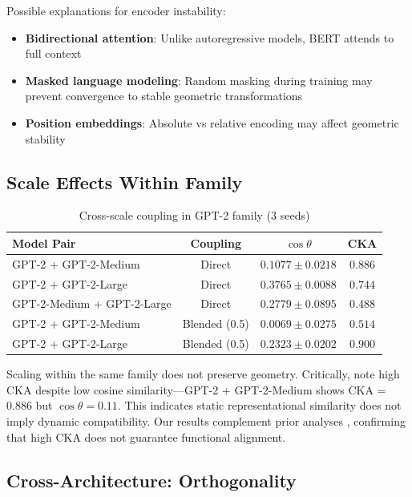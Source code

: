 \documentclass[10pt]{article} %
\theoremstyle{plain}
\theoremstyle{definition}
\theoremstyle{remark}
\begin{document}
Possible explanations for encoder instability:
\begin{itemize}
    \item \textbf{Bidirectional attention}: Unlike autoregressive models, BERT attends to full context
    \item \textbf{Masked language modeling}: Random masking during training may prevent convergence to stable geometric transformations
    \item \textbf{Position embeddings}: Absolute vs relative encoding may affect geometric stability
\end{itemize}

\subsection{Scale Effects Within Family}

\begin{table}[htbp]
\centering
\caption{Cross-scale coupling in GPT-2 family (3 seeds)}
\label{tab:scale}
\small
\begin{tabular}{lccc}
\toprule
\textbf{Model Pair} & \textbf{Coupling} & \textbf{$\cos \theta$} & \textbf{CKA} \\
\midrule
GPT-2 + GPT-2-Medium & Direct & $0.1077 \pm 0.0218$ & $0.886$ \\
GPT-2 + GPT-2-Large & Direct & $0.3765 \pm 0.0088$ & $0.744$ \\
GPT-2-Medium + GPT-2-Large & Direct & $0.2779 \pm 0.0895$ & $0.488$ \\
\midrule
GPT-2 + GPT-2-Medium & Blended (0.5) & $0.0069 \pm 0.0275$ & $0.514$ \\
GPT-2 + GPT-2-Large & Blended (0.5) & $0.2323 \pm 0.0202$ & $0.900$ \\
\bottomrule
\end{tabular}
\end{table}

Scaling within the same family does not preserve geometry. Critically, note high CKA despite low cosine similarity---GPT-2 + GPT-2-Medium shows CKA = 0.886 but $\cos \theta = 0.11$. This indicates static representational similarity does not imply dynamic compatibility. Our results complement prior analyses \cite{hauser2021similar,ding2021grounding}, confirming that high CKA does not guarantee functional alignment.

\subsection{Cross-Architecture: Orthogonality}
\end{document}
